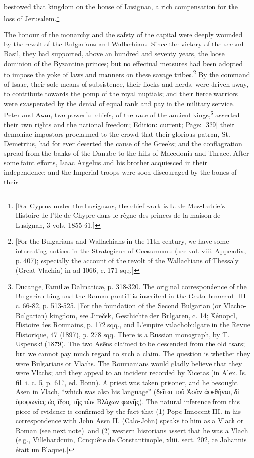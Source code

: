 bestowed that kingdom on the house of Lusignan, a rich compensation for the loss of Jerusalem.\footnote{[For Cyprus under the Lusignans, the chief work is L. de Mas-Latrie\texthebrew{}’s Histoire de l\texthebrew{}’tle de Chypre dans le règne des princes de la maison de Lusignan, 3 vols. 1855-61.]}

The honour of the monarchy and the safety of the capital were deeply wounded by the revolt of the Bulgarians and Wallachians. Since the victory of the second Basil, they had supported, above an hundred and seventy years, the loose dominion of the Byzantine princes; but no effectual measures had been adopted to impose the yoke of laws and manners on these savage tribes.\footnote{[For the Bulgarians and Wallachians in the 11th century, we have some interesting notices in the Strategicon of Cecaumenos (see vol. viii. Appendix, p. 407); especially the account of the revolt of the Wallachians of Thessaly (Great Vlachia) in ad 1066, c. 171 sqq.]} By the command of Isaac, their sole means of subsistence, their flocks and herds, were driven away, to contribute towards the pomp of the royal nuptials; and their fierce warriors were exasperated by the denial of equal rank and pay in the military service. Peter and Asan, two powerful chiefs, of the race of the ancient kings,\footnote{Ducange, Familiæ Dalmaticæ, p. 318-320. The original correspondence of the Bulgarian king and the Roman pontiff is inscribed in the Gesta Innocent. III. c. 66-82, p. 513-525. [For the foundation of the Second Bulgarian (or Vlacho-Bulgarian) kingdom, see Jireček, Geschichte der Bulgaren, c. 14; Xénopol, Histoire des Roumains, p. 172 sqq., and L\texthebrew{}’empire valachobulgare in the Revue Historique, 47 (1897), p. 278 sqq. There is a Russian monograph, by T. Uspenski (1879). The two Asēns claimed to be descended from the old tsars; but we cannot pay much regard to such a claim. The question is whether they were Bulgarians or Vlachs. The Roumanians would gladly believe that they were Vlachs; and they appeal to an incident recorded by Nicetas (in Alex. Is. fil. i. c. 5, p. 617, ed. Bonn). A priest was taken prisoner, and he besought Asēn in Vlach, \texthebrew{“}which was also his language\texthebrew{}” (\textgreek{δε\texthebrew{ῖ}ται το\texthebrew{ῦ Ἀ}σ\texthebrew{ᾶ}ν \texthebrew{ἀ}φεθ\texthebrew{ῆ}ναι, δ\texthebrew{ἰ ὸ}μοφωνίας \texthebrew{ὡ}ς \texthebrew{ἴ}δρις τ\texthebrew{ῆ}ς τ\texthebrew{ῶ}ν Βλάχων φων\texthebrew{ῆ}ς}). The natural inference from this piece of evidence is confirmed by the fact that (1) Pope Innocent III. in his correspondence with John Asēn II. (Calo-John) speaks to him as a Vlach or Roman (see next note); and (2) western historians assert that he was a Vlach (e.g., Villehardouin, Conquête de Constantinople, xliii. sect. 202, ce Johannis était un Blaque).]} asserted their own rights and the national freedom; Edition: current; Page: [339] their demoniac impostors proclaimed to the crowd that their glorious patron, St. Demetrius, had for ever deserted the cause of the Greeks; and the conflagration spread from the banks of the Danube to the hills of Macedonia and Thrace. After some faint efforts, Isaac Angelus and his brother acquiesced in their independence; and the Imperial troops were soon discouraged by the bones of their 
